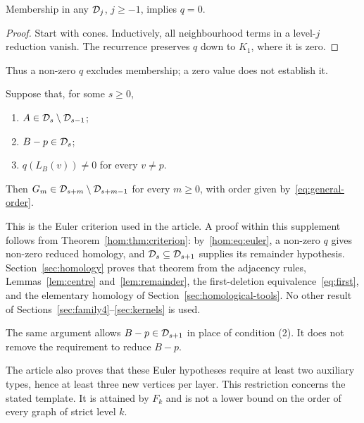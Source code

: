 \begin{lemma}\label{lem:qobstruction}
Membership in any $\mathcal D_j$, $j\geq-1$, implies $q=0$.
\end{lemma}
\begin{proof}
Start with cones. Inductively, all neighbourhood terms in a level-$j$
reduction vanish. The recurrence preserves $q$ down to $K_1$, where it is zero.
\end{proof}
Thus a non-zero $q$ excludes membership; a zero value does not establish it.

\begin{theorem}\label{thm:template}
Suppose that, for some $s\geq0$,
\begin{enumerate}
\item $A\in\mathcal D_s\setminus\mathcal D_{s-1}$;
\item $B-p\in\mathcal D_s$;
\item $q(L_B(v))\ne0$ for every $v\ne p$.
\end{enumerate}
Then $G_m\in\mathcal D_{s+m}\setminus\mathcal D_{s+m-1}$ for every $m\geq0$, with
order given by~\eqref{eq:general-order}.
\end{theorem}
This is the Euler criterion used in the article. A proof within this supplement
follows from Theorem~\ref{hom:thm:criterion}: by~\eqref{hom:eq:euler}, a non-zero
$q$ gives non-zero reduced homology, and $\mathcal D_s\subseteq\mathcal D_{s+1}$ supplies
its remainder hypothesis. Section~\ref{sec:homology} proves that theorem
from the adjacency rules, Lemmas~\ref{lem:centre} and~\ref{lem:remainder},
the first-deletion equivalence~\eqref{eq:first}, and the elementary homology
of Section~\ref{sec:homological-tools}.
No other result of Sections~\ref{sec:family4}--\ref{sec:kernels} is used.

\begin{remark}\label{rem:rest-hypothesis}
The same argument allows $B-p\in\mathcal D_{s+1}$ in place of condition (2).
It does not remove the requirement to reduce $B-p$.
\end{remark}

The article also proves that these Euler hypotheses require at least two
auxiliary types, hence at least three new vertices per layer. This restriction
concerns the stated template. It is attained by $F_k$ and is not a lower bound
on the order of every graph of strict level $k$.
